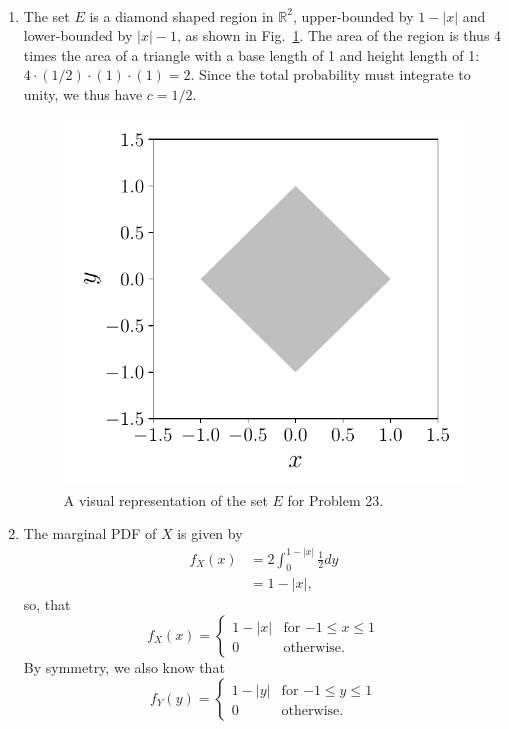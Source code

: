 \begin{problem}{23} $ $
\begin{enumerate}

\item The set $E$ is a diamond shaped region in $\mathbb R^2$, upper-bounded by $1-|x|$ and lower-bounded by $|x|-1$, as shown in Fig.~\ref{fig:prob_23}.  The area of the region is thus 4 times the area of a triangle with a base length of 1 and height length of 1: $4\cdot(1/2)\cdot(1)\cdot(1)=2$.  Since the total probability must integrate to unity, we thus have $c=1/2$.

	\begin{figure}[t]
	\centering
      		 \includegraphics[totalheight=7cm]{chpt5/prob23.pdf}
  			  \caption{A visual representation of the set $E$ for Problem 23.}
    			   \label{fig:prob_23}
	\end{figure}

\item
The marginal PDF of $X$ is given by 
\begin{align*}
f_X(x) &= 2\int_0^{1-|x|} \frac{1}{2} dy \\
& =1-|x|,
\end{align*}
so, that
\[
 f_X(x) =
  \begin{cases}
                                   1-|x| & \text{for $-1 \le x \le 1$} \\
                                   0& \text{otherwise}.
   \end{cases}
\]
By symmetry, we also know that 
\[
 f_Y(y) =
  \begin{cases}
                                   1-|y| & \text{for $-1 \le y \le 1$} \\
                                   0& \text{otherwise}.
   \end{cases}
\]


\end{enumerate}
\end{problem}
